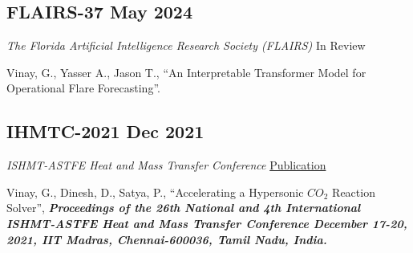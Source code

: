 \subsection{FLAIRS-37 \hfill May 2024}
{\textit{The Florida Artificial Intelligence Research Society (FLAIRS)} \hfill {In Review}}
\begin{zitemize}
\item {Vinay, G., Yasser A., Jason T., ``An Interpretable Transformer Model for Operational Flare Forecasting''.}
\end{zitemize}

\subsection{IHMTC-2021 \hfill Dec 2021}
{\textit{ISHMT-ASTFE Heat and Mass Transfer Conference} \hfill \href{https://www.dl.begellhouse.com/references/486d924a7e5ad8c3,393f7ffc7879d8ca,2aa0e4f13f8adbd7.html}{Publication}}
\begin{zitemize}
\item {Vinay, G., Dinesh, D., Satya, P., ``Accelerating a Hypersonic $CO_2$ Reaction Solver'', \textit{\textbf{Proceedings of the 26th National and 4th International ISHMT-ASTFE Heat and Mass Transfer Conference December 17-20, 2021, IIT Madras, Chennai-600036, Tamil Nadu, India.}}}
\end{zitemize}

